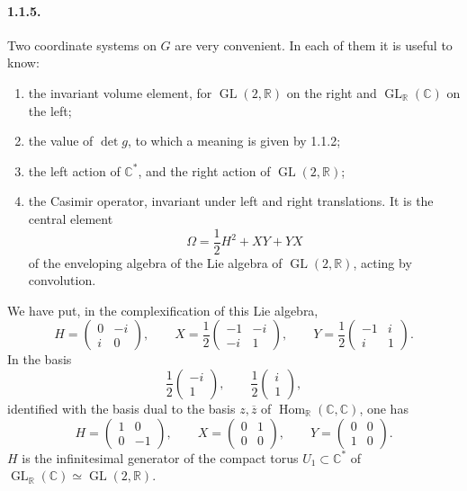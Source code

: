 \documentclass[10pt,a4paper]{article}
\providecommand{\GL}{\operatorname{GL}}
\providecommand{\Hom}{\operatorname{Hom}}
\providecommand{\R}{\mathbb R}
\providecommand{\C}{\mathbb C}
\begin{document}
\paragraph{1.1.5.} Two coordinate systems on \(G\) are very convenient. In each of them it is useful to know:
\begin{enumerate}[label=(\Alph*)]
\item the invariant volume element, for \(\GL(2,\R)\) on the right and \(\GL_{\R}(\C)\) on the left;
\item the value of \(\det g\), to which a meaning is given by 1.1.2;
\item the left action of \(\C^*\), and the right action of \(\GL(2,\R)\);
\item the Casimir operator, invariant under left and right translations. It is the central element
\[
\Omega=\frac12H^2+XY+YX
\]
of the enveloping algebra of the Lie algebra of \(\GL(2,\R)\), acting by convolution.
\end{enumerate}
We have put, in the complexification of this Lie algebra,
\[
H=\begin{pmatrix}0&-i\\ i&0\end{pmatrix},\qquad
X=\frac12\begin{pmatrix}-1&-i\\ -i&1\end{pmatrix},\qquad
Y=\frac12\begin{pmatrix}-1&i\\ i&1\end{pmatrix}.
\]
In the basis
\[
\frac12\begin{pmatrix}-i\\1\end{pmatrix},\qquad \frac12\begin{pmatrix}i\\1\end{pmatrix},
\]
identified with the basis dual to the basis \(z,\overline z\) of \(\Hom_{\R}(\C,\C)\), one has
\[
H=\begin{pmatrix}1&0\\0&-1\end{pmatrix},\qquad
X=\begin{pmatrix}0&1\\0&0\end{pmatrix},\qquad
Y=\begin{pmatrix}0&0\\1&0\end{pmatrix}.
\]
\(H\) is the infinitesimal generator of the compact torus \(U_1\subset\C^*\) of \(\GL_{\R}(\C)\simeq\GL(2,\R)\).
\end{document}
